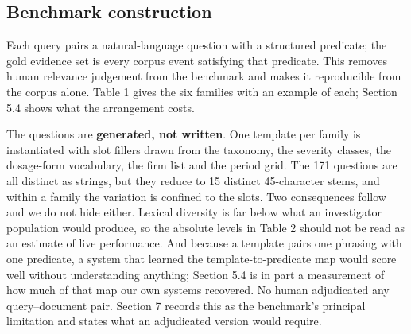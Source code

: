 \documentclass[runningheads]{llncs}
\begin{document}
\subsection{Benchmark construction}
Each query pairs a natural-language question with a structured predicate; the gold evidence set is every corpus event satisfying that predicate. This removes human relevance judgement from the benchmark and makes it reproducible from the corpus alone. Table 1 gives the six families with an example of each; Section 5.4 shows what the arrangement costs.

The questions are \textbf{generated, not written}. One template per family is instantiated with slot fillers drawn from the taxonomy, the severity classes, the dosage-form vocabulary, the firm list and the period grid. The 171 questions are all distinct as strings, but they reduce to 15 distinct 45-character stems, and within a family the variation is confined to the slots. Two consequences follow and we do not hide either. Lexical diversity is far below what an investigator population would produce, so the absolute levels in Table 2 should not be read as an estimate of live performance. And because a template pairs one phrasing with one predicate, a system that learned the template-to-predicate map would score well without understanding anything; Section 5.4 is in part a measurement of how much of that map our own systems recovered. No human adjudicated any query--document pair. Section 7 records this as the benchmark's principal limitation and states what an adjudicated version would require.
\end{document}
